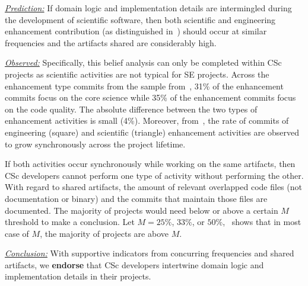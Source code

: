 \documentclass[conference,10pt]{IEEEtran}
\newenvironment{RQ}{\vspace{1mm}\begin{tcolorbox}[enhanced,width=3.4in,size=fbox,colback=red!5!white,drop shadow southeast,sharp corners]}{\end{tcolorbox}}
\begin{document}
\noindent \textit{\underline{Prediction:}} If domain logic and implementation details are intermingled during the development of scientific software, then both scientific and engineering enhancement contribution (as distinguished in~) should occur at similar frequencies and the artifacts shared are considerably high.

\noindent \textit{\underline{Observed:}} Specifically, this belief analysis can only be completed within CSc projects as scientific activities are not typical for SE projects. Across the enhancement type commits from the sample from~, 31\% of the enhancement commits focus on the core science while 35\% of the enhancement commits focus on the code quality. The absolute difference between the two types of enhancement activities is small (4\%). Moreover, from~, the rate of commits of engineering (square) and scientific (triangle) enhancement activities are observed to grow synchronously across the project lifetime. 

If both activities occur synchronously while working on the same artifacts, then CSc developers cannot perform one type of activity without performing the other. With regard to shared artifacts, the amount of relevant overlapped code files (not documentation or binary) and the commits that maintain those files are documented. The majority of projects would need below or above a certain $M$ threshold to make a conclusion. Let $M = 25\%$, $33\%$, or $50\%$,~ shows that in most case of $M$, the majority of projects are above $M$.



\begin{RQ}
\textit{\underline{Conclusion:}} With supportive indicators from concurring frequencies and shared artifacts,  
we \textbf{endorse} that CSc developers intertwine domain logic and implementation details in their projects.
\end{RQ}
\end{document}

